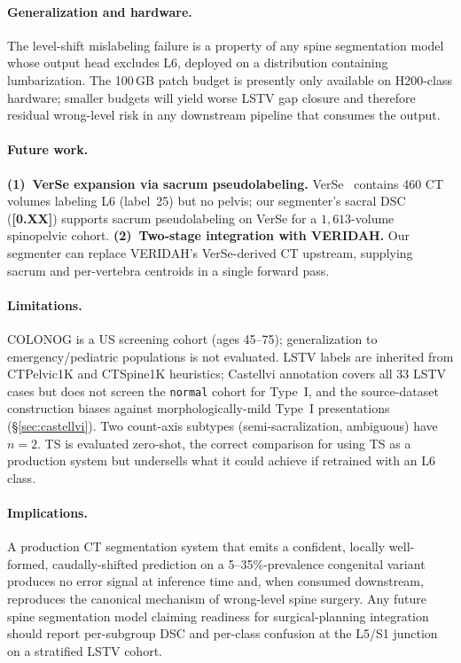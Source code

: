 \documentclass{article}
\newcommand{\sota}{TS}
\newcommand{\VERIDAH}{VERIDAH}
\newcommand{\VerSe}{VerSe}
\begin{document}
\paragraph{Generalization and hardware.}
The level-shift mislabeling failure is a property of any
spine segmentation model whose output head excludes L6,
deployed on a distribution containing lumbarization. The
100\,GB patch budget is presently only available on
H200-class hardware; smaller budgets will yield worse LSTV
gap closure and therefore residual wrong-level risk in any
downstream pipeline that consumes the output.

\paragraph{Future work.}
\textbf{(1)~\VerSe{} expansion via sacrum
pseudolabeling.} \VerSe{}~\citep{Sekuboyina2021VerSe:Images}
contains 460 CT volumes labeling L6 (label~25) but no
pelvis; our segmenter's sacral DSC (\textbf{[0.XX]})
supports sacrum pseudolabeling on \VerSe{} for a
$1{,}613$-volume spinopelvic cohort.
\textbf{(2)~Two-stage integration with \VERIDAH{}.}
Our segmenter can replace \VERIDAH{}'s \VerSe{}-derived
CT upstream, supplying sacrum and per-vertebra centroids
in a single forward pass.

\paragraph{Limitations.}
COLONOG is a US screening cohort (ages 45--75);
generalization to emergency/pediatric populations is not
evaluated. LSTV labels are inherited from CTPelvic1K and
CTSpine1K heuristics; Castellvi annotation covers all 33
LSTV cases but does not screen the \texttt{normal} cohort
for Type~I, and the source-dataset construction biases
against morphologically-mild Type~I presentations
(\S\ref{sec:castellvi}). Two count-axis subtypes
(semi-sacralization, ambiguous) have $n=2$. \sota{} is
evaluated zero-shot, the correct comparison for using
\sota{} as a production system but undersells what it
could achieve if retrained with an L6 class.

\paragraph{Implications.}
A production CT segmentation system that emits a confident,
locally well-formed, caudally-shifted prediction on a
5--35\%-prevalence congenital variant produces no error
signal at inference time and, when consumed downstream,
reproduces the canonical mechanism of wrong-level spine
surgery. Any future spine segmentation model claiming
readiness for surgical-planning integration should report
per-subgroup DSC and per-class confusion at the L5/S1
junction on a stratified LSTV cohort.
\end{document}
